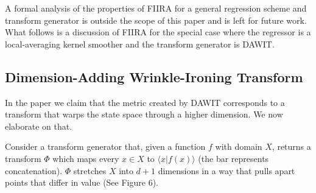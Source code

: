 A formal analysis of the properties of FIIRA
for a general regression scheme and transform generator
is outside the scope of this paper and is left for future work.
What follows is a discussion of FIIRA for the special
case where the regressor is a local-averaging kernel smoother
and the transform generator is DAWIT.

\subsection{Dimension-Adding Wrinkle-Ironing Transform}
In the paper we claim that the metric created by DAWIT corresponds to a
transform that warps the state space through a higher dimension.
We now elaborate on that.

Consider a transform generator that, given a function $f$ with domain $X$, 
returns a transform $\Phi$ which maps every $x \in X$ to $\langle x | f(x)\rangle$
(the bar represents concatenation).
$\Phi$ stretches $X$ into $d+1$ dimensions in a way that
pulls apart points that differ in value (See Figure 6).

